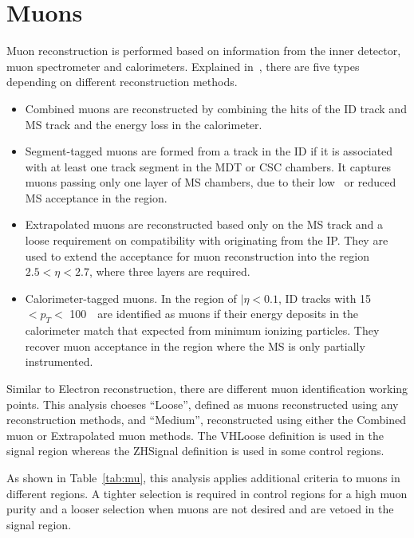 \section{Muons}
\label{sec:mu}

\par Muon reconstruction is performed based on information from the inner detector, muon spectrometer and calorimeters. Explained in~\cite{Aad:2016jkr}, there are five types depending on different reconstruction methods.

\begin{itemize}
    \item Combined muons are reconstructed by combining the hits of the ID track and MS track and the energy loss in the calorimeter.
    \item Segment-tagged muons are formed from a track in the ID if it is associated with at least one track segment in the MDT or CSC chambers. It captures muons passing only one layer of MS chambers, due to their low \pt~or reduced MS acceptance in the region.
    \item Extrapolated muons are reconstructed based only on the MS track and a loose requirement on compatibility with originating from the IP. They are used to extend the acceptance for muon reconstruction into the region $2.5 <\eta< 2.7$, where three layers are required.
    \item Calorimeter-tagged muons. In the region of $|\eta< 0.1$, ID tracks with 15~\GeV~$< p_T <$ 100~\GeV~are identified as muons if their energy deposits in the calorimeter match that expected from minimum ionizing particles. They recover muon acceptance in the region where the MS is only partially instrumented.
\end{itemize}

\par Similar to Electron reconstruction, there are different muon identification working points. This analysis choeses ``Loose'', defined as muons reconstructed using any reconstruction methods, and ``Medium'', reconstructed using either the Combined muon or Extrapolated muon methods. The VHLoose definition is used in the signal region whereas the ZHSignal definition is used in some control regions.					
\par As shown in Table~\ref{tab:mu}, this analysis applies additional criteria to muons in different regions. A tighter selection is required in control regions for a high muon purity and a looser selection when muons are not desired and are vetoed in the signal region.

